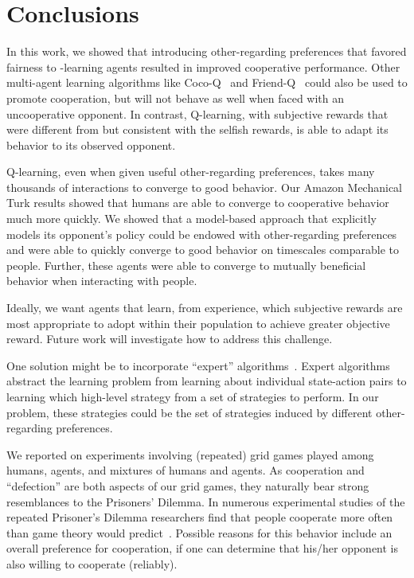 \documentclass[letterpaper]{article}
\begin{document}
\section{Conclusions}

In this work, we showed that introducing other-regarding preferences
that favored fairness to \Q-learning agents resulted in improved
cooperative performance. Other multi-agent learning algorithms like
Coco-Q~\cite{sodomka13} and Friend-Q~\cite{littman94} could also be
used to promote cooperation, but will not behave as well when faced with
an uncooperative opponent. In contrast, Q-learning, with subjective
rewards that were different from but consistent with the selfish
rewards, is able to adapt its behavior to its observed opponent.

Q-learning, even when given useful other-regarding preferences, takes
many thousands of interactions to converge to good behavior. Our
Amazon Mechanical Turk results showed that humans are able to converge
to cooperative behavior much more quickly. We showed that a
model-based approach that explicitly models its opponent's policy
could be endowed with other-regarding preferences and were able to
quickly converge to good behavior on timescales comparable to people. Further, these agents were able to converge to mutually beneficial behavior when interacting with people.

Ideally, we want agents that learn, from experience, which subjective
rewards are most appropriate to adopt within their population to
achieve greater objective reward. Future work will investigate how to
address this challenge.


One solution might be to incorporate ``expert''
algorithms~\cite{crandall14,megiddo05}. Expert algorithms abstract the
learning problem from learning about individual state-action pairs to
learning which high-level strategy from a set of strategies to
perform. In our problem, these strategies could be the set of
strategies induced by different other-regarding preferences.

We reported on experiments involving (repeated) grid games played
among humans, agents, and mixtures of humans and agents.  As
cooperation and ``defection'' are both aspects of our grid games, they
naturally bear strong resemblances to the Prisoners' Dilemma.  In
numerous experimental studies of the repeated Prisoner's Dilemma
researchers find that people cooperate more often than game theory
would predict~\cite{camerer03}. Possible reasons for this behavior
include an overall preference for cooperation, if one can determine
that his/her opponent is also willing to cooperate (reliably). 
\end{document}
